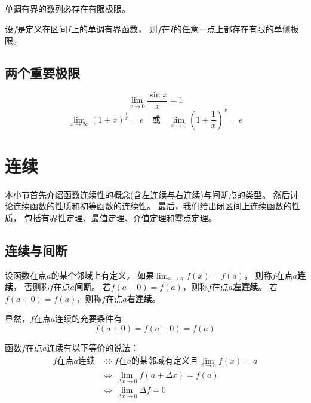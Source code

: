 \begin{theorem}[数列的单调有界定理]
  单调有界的数列必存在有限极限。
\end{theorem}

\begin{theorem}[函数的单调有界定理]
  设$f$是定义在区间$I$上的单调有界函数，
  则$f$在$I$的任意一点上都存在有限的单侧极限。
\end{theorem}

\subsection{两个重要极限}
\begin{displaymath}
  \lim_{x\to 0}\frac{\sin x}{x}=1
\end{displaymath}
\begin{displaymath}
  \lim_{x\to\infty}\left(1+x\right)^{\frac{1}{x}} = e
  \quad\text{或}\quad
  \lim_{x\to 0}\left(1+\frac{1}{x}\right)^{x} = e
\end{displaymath}

\section{连续}
本小节首先介绍函数连续性的概念(含左连续与右连续)与间断点的类型。
然后讨论连续函数的性质和初等函数的连续性。
最后，我们给出闭区间上连续函数的性质，
包括有界性定理、最值定理、介值定理和零点定理。

\subsection{连续与间断}
\begin{definition}
  设函数在点$a$的某个邻域上有定义。
  如果$\lim_{x\to a}f(x)=f(a)$，
  则称$f$在点$a$\textbf{连续}，
  否则称$f$在点$a$\textbf{间断}。
  若$f(a-0)=f(a)$，则称$f$在点$a$\textbf{左连续}。
  若$f(a+0)=f(a)$，则称$f$在点$a$\textbf{右连续}。
\end{definition}
\begin{remark}
  显然，$f$在点$a$连续的充要条件有
  \begin{displaymath}
    f(a+0)=f(a-0)=f(a)
  \end{displaymath}
\end{remark}

函数$f$在点$a$连续有以下等价的说法：
\begin{align*}
  \text{$f$在点$a$连续}
  &\iff \text{$f$在$a$的某邻域有定义且$\lim_{x\to a}f(x)=a$} \\
  &\iff \lim_{\Delta x\to 0}f(a+\Delta x)=f(a) \\
  &\iff \lim_{\Delta x\to 0}\Delta f = 0
\end{align*}

